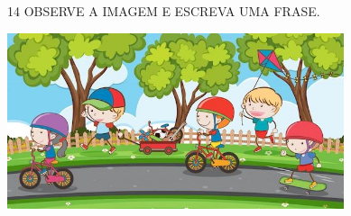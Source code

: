 






\num{14} OBSERVE A IMAGEM E ESCREVA UMA FRASE.


\includegraphics[width=3.88542in,height=2.03581in]{media/image122.jpg}

